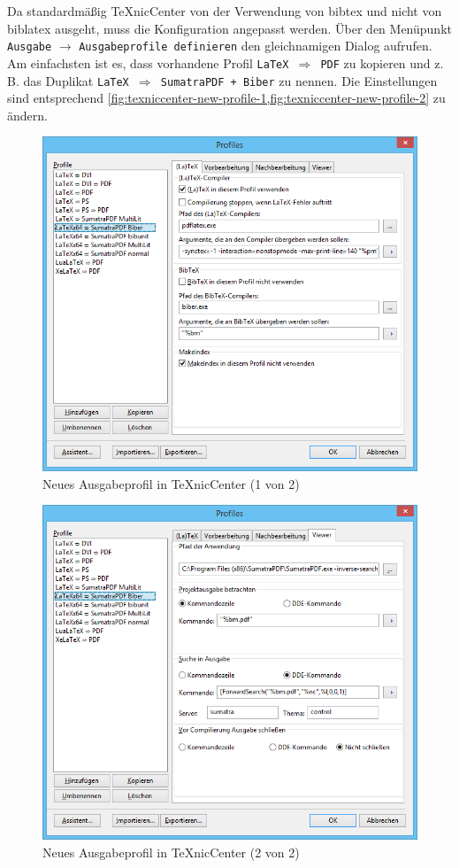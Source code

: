 Da standardmäßig TeXnicCenter von der Verwendung von \gls{bibtex} und nicht
von \gls{biblatex} ausgeht, muss die Konfiguration angepasst werden. Über
den Menüpunkt \texttt{Ausgabe} $\rightarrow$ \texttt{Aus\-ga\-be\-pro\-fi\-le definieren}
den gleichnamigen Dialog aufrufen. Am einfachsten ist es, dass vorhandene Profil
\texttt{LaTeX $\Rightarrow$ PDF} zu kopieren und z.\,B. das Duplikat
\texttt{LaTeX $\Rightarrow$ SumatraPDF + Biber} zu nennen. Die Einstellungen
sind entsprechend \cref{fig:texniccenter-new-profile-1,fig:texniccenter-new-profile-2}
zu ändern.
\begin{figure}[htbp]
\centering
\includegraphics{./images/texniccenter-profile-01.png}
\caption{Neues Ausgabeprofil in TeXnicCenter (1 von 2)}
\label{fig:texniccenter-new-profile-1}
\end{figure}
\begin{figure}[htbp]
\centering
\includegraphics{./images/texniccenter-profile-02.png}
\caption{Neues Ausgabeprofil in TeXnicCenter (2 von 2)}
\label{fig:texniccenter-new-profile-2}
\end{figure}
